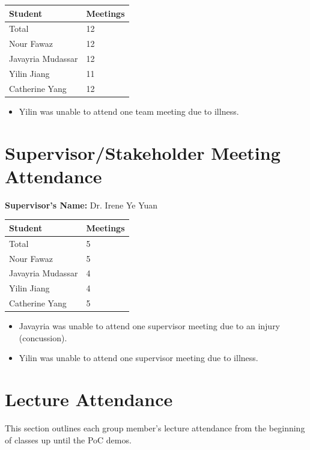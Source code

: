 \documentclass{article}
\begin{document}
\begin{table}[H]
\centering
\begin{tabular}{ll}
\toprule
\textbf{Student} & \textbf{Meetings}\\
\midrule
Total & 12\\
Nour Fawaz & 12 \\
Javayria Mudassar & 12 \\
Yilin Jiang & 11 \\
Catherine Yang & 12 \\
\bottomrule
\end{tabular}
\end{table}

\begin{itemize}
    \item Yilin was unable to attend one team meeting due to illness.
\end{itemize}

\section{Supervisor/Stakeholder Meeting Attendance}

\noindent \textbf{Supervisor's Name: } Dr. Irene Ye Yuan

\begin{table}[H]
\centering
\begin{tabular}{ll}
\toprule
\textbf{Student} & \textbf{Meetings}\\
\midrule
Total & 5\\
Nour Fawaz & 5 \\
Javayria Mudassar & 4 \\
Yilin Jiang & 4 \\
Catherine Yang & 5 \\
\bottomrule
\end{tabular}
\end{table}
\begin{itemize}
    \item Javayria was unable to attend one supervisor meeting due to an injury (concussion).
    \item Yilin was unable to attend one supervisor meeting due to illness.
\end{itemize}

\section{Lecture Attendance}
This section outlines each group member’s lecture attendance from the beginning of classes up until the PoC demos.
\end{document}
